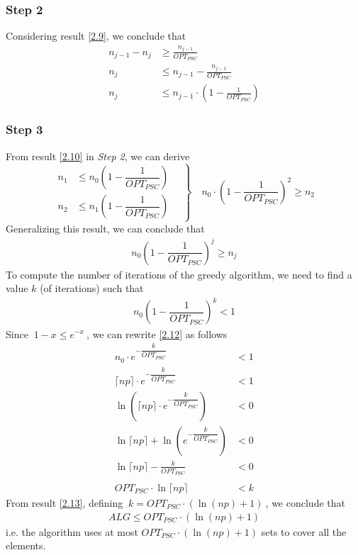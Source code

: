\documentclass[a4paper,11pt]{article}
\begin{document}
\subsubsection{Step 2}
Considering result \ref{2.9}, we conclude that
\begin{align}
n_{j-1} - n_j &\geq \frac{n_{j-1}}{OPT_{PSC}}\nonumber\\
n_j &\leq n_{j-1} - \frac{n_{j-1}}{OPT_{PSC}}\nonumber\\
n_j &\leq n_{j-1}\cdot \left(1 - \frac{1}{OPT_{PSC}}\right) \label{2.10}
\end{align}




\subsubsection{Step 3}
From result \ref{2.10} in \textit{Step 2}, we can derive
\begin{equation}
\left.\begin{aligned}
n_{1} &\le n_{0}\left( 1 -\dfrac{1}{OPT_{PSC}} \right)\\
n_{2} &\le n_{1}\left( 1 -\dfrac{1}{OPT_{PSC}} \right)
\end{aligned}
\quad \right\}
\quad n_0 \cdot  \left(1 - \frac{1}{OPT_{PSC}}\right)^2 \geq n_2 \nonumber
\end{equation}
Generalizing this result, we can conclude that
\begin{align}
n_{0}\left( 1 -\dfrac{1}{OPT_{PSC}} \right)^j \ge n_{j} \label{2.11}
\end{align}
To compute the number of iterations of the greedy algorithm, we need to find a value $k$ (of iterations) such that
\begin{align}
n_{0}\left( 1 -\dfrac{1}{OPT_{PSC}} \right)^k < 1 \label{2.12}
\end{align}
Since $\ 1-x \leq e^{-x} \ $, we can rewrite \ref{2.12} as follows
\begin{align}
n_0 \cdot  e^{-\dfrac{k}{OPT_{PSC}}} &< 1 \nonumber\\
\lceil np \rceil \cdot e^{-\dfrac{k}{OPT_{PSC}}} &< 1 \nonumber\\
\ln\left(\lceil np \rceil\cdot e^{-\dfrac{k}{OPT_{PSC}}}\right) &< 0 \nonumber\\
\ln \lceil np \rceil + \ln \left(e^{-\dfrac{k}{OPT_{PSC}}}\right ) &< 0 \nonumber\\
\ln \lceil np \rceil - \frac{k}{OPT_{PSC}} &< 0 \nonumber\\
\nonumber\\
OPT_{PSC} \cdot \ln \lceil np \rceil &< k \label{2.13}
\end{align}
From result \ref{2.13}, defining $\ k =  OPT_{PSC} \cdot (\ln (np) + 1) \ $, we conclude that
\begin{align}
ALG \leq OPT_{PSC} \cdot (\ln(np) + 1)
\end{align}
i.e. the algorithm uses at most $OPT_{PSC} \cdot (\ln(np) + 1)$ sets to cover all the elements.
\end{document}
